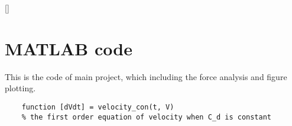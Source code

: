 \documentclass[main.tex]{subfiles}
\begin{document}
[]

\appendix
\section{MATLAB code}

This is the code of main project, which including the force analysis and figure plotting.

\begin{lstlisting}
    function [dVdt] = velocity_con(t, V)
    % the first order equation of velocity when C_d is constant
\end{lstlisting}
\end{document}
